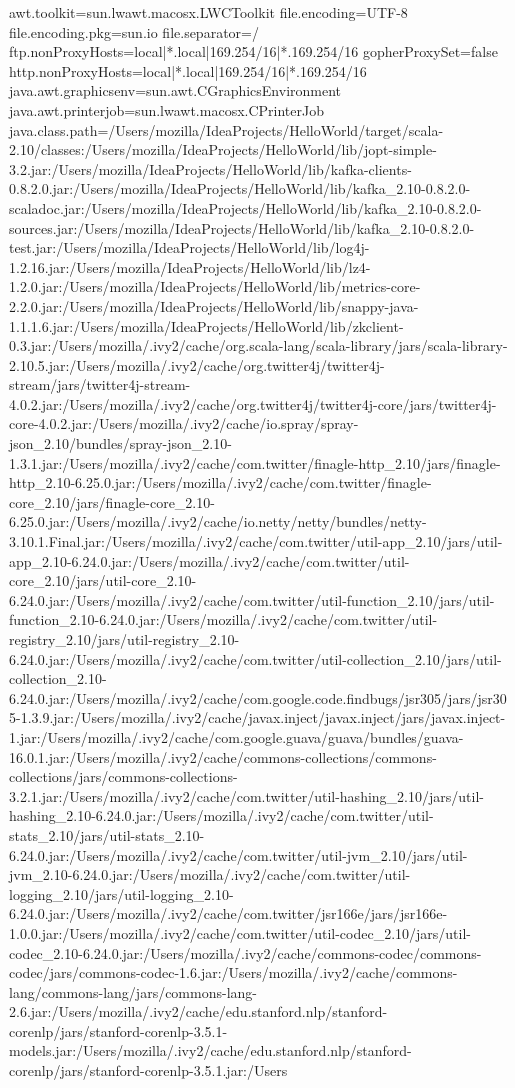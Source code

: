 awt.toolkit=sun.lwawt.macosx.LWCToolkit
file.encoding=UTF-8
file.encoding.pkg=sun.io
file.separator=/
ftp.nonProxyHosts=local|*.local|169.254/16|*.169.254/16
gopherProxySet=false
http.nonProxyHosts=local|*.local|169.254/16|*.169.254/16
java.awt.graphicsenv=sun.awt.CGraphicsEnvironment
java.awt.printerjob=sun.lwawt.macosx.CPrinterJob
java.class.path=/Users/mozilla/IdeaProjects/HelloWorld/target/scala-2.10/classes:/Users/mozilla/IdeaProjects/HelloWorld/lib/jopt-simple-3.2.jar:/Users/mozilla/IdeaProjects/HelloWorld/lib/kafka-clients-0.8.2.0.jar:/Users/mozilla/IdeaProjects/HelloWorld/lib/kafka_2.10-0.8.2.0-scaladoc.jar:/Users/mozilla/IdeaProjects/HelloWorld/lib/kafka_2.10-0.8.2.0-sources.jar:/Users/mozilla/IdeaProjects/HelloWorld/lib/kafka_2.10-0.8.2.0-test.jar:/Users/mozilla/IdeaProjects/HelloWorld/lib/log4j-1.2.16.jar:/Users/mozilla/IdeaProjects/HelloWorld/lib/lz4-1.2.0.jar:/Users/mozilla/IdeaProjects/HelloWorld/lib/metrics-core-2.2.0.jar:/Users/mozilla/IdeaProjects/HelloWorld/lib/snappy-java-1.1.1.6.jar:/Users/mozilla/IdeaProjects/HelloWorld/lib/zkclient-0.3.jar:/Users/mozilla/.ivy2/cache/org.scala-lang/scala-library/jars/scala-library-2.10.5.jar:/Users/mozilla/.ivy2/cache/org.twitter4j/twitter4j-stream/jars/twitter4j-stream-4.0.2.jar:/Users/mozilla/.ivy2/cache/org.twitter4j/twitter4j-core/jars/twitter4j-core-4.0.2.jar:/Users/mozilla/.ivy2/cache/io.spray/spray-json_2.10/bundles/spray-json_2.10-1.3.1.jar:/Users/mozilla/.ivy2/cache/com.twitter/finagle-http_2.10/jars/finagle-http_2.10-6.25.0.jar:/Users/mozilla/.ivy2/cache/com.twitter/finagle-core_2.10/jars/finagle-core_2.10-6.25.0.jar:/Users/mozilla/.ivy2/cache/io.netty/netty/bundles/netty-3.10.1.Final.jar:/Users/mozilla/.ivy2/cache/com.twitter/util-app_2.10/jars/util-app_2.10-6.24.0.jar:/Users/mozilla/.ivy2/cache/com.twitter/util-core_2.10/jars/util-core_2.10-6.24.0.jar:/Users/mozilla/.ivy2/cache/com.twitter/util-function_2.10/jars/util-function_2.10-6.24.0.jar:/Users/mozilla/.ivy2/cache/com.twitter/util-registry_2.10/jars/util-registry_2.10-6.24.0.jar:/Users/mozilla/.ivy2/cache/com.twitter/util-collection_2.10/jars/util-collection_2.10-6.24.0.jar:/Users/mozilla/.ivy2/cache/com.google.code.findbugs/jsr305/jars/jsr305-1.3.9.jar:/Users/mozilla/.ivy2/cache/javax.inject/javax.inject/jars/javax.inject-1.jar:/Users/mozilla/.ivy2/cache/com.google.guava/guava/bundles/guava-16.0.1.jar:/Users/mozilla/.ivy2/cache/commons-collections/commons-collections/jars/commons-collections-3.2.1.jar:/Users/mozilla/.ivy2/cache/com.twitter/util-hashing_2.10/jars/util-hashing_2.10-6.24.0.jar:/Users/mozilla/.ivy2/cache/com.twitter/util-stats_2.10/jars/util-stats_2.10-6.24.0.jar:/Users/mozilla/.ivy2/cache/com.twitter/util-jvm_2.10/jars/util-jvm_2.10-6.24.0.jar:/Users/mozilla/.ivy2/cache/com.twitter/util-logging_2.10/jars/util-logging_2.10-6.24.0.jar:/Users/mozilla/.ivy2/cache/com.twitter/jsr166e/jars/jsr166e-1.0.0.jar:/Users/mozilla/.ivy2/cache/com.twitter/util-codec_2.10/jars/util-codec_2.10-6.24.0.jar:/Users/mozilla/.ivy2/cache/commons-codec/commons-codec/jars/commons-codec-1.6.jar:/Users/mozilla/.ivy2/cache/commons-lang/commons-lang/jars/commons-lang-2.6.jar:/Users/mozilla/.ivy2/cache/edu.stanford.nlp/stanford-corenlp/jars/stanford-corenlp-3.5.1-models.jar:/Users/mozilla/.ivy2/cache/edu.stanford.nlp/stanford-corenlp/jars/stanford-corenlp-3.5.1.jar:/Users